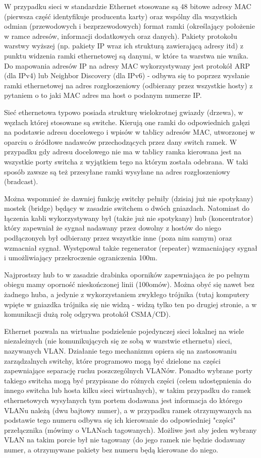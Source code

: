 W przypadku sieci w standardzie Ethernet stosowane są 48 bitowe adresy MAC (pierwsza część identyfikuje producenta karty) oraz wspólny dla wszystkich odmian (przewodowych i bezprzewodowych) format ramki (określający położenie w ramce adresów, informacji dodatkowych oraz danych). Pakiety protokołu warstwy wyższej (np. pakiety IP wraz ich strukturą zawierającą adresy itd) z punktu widzenia ramki ethernetowej są danymi, w które ta warstwa nie wnika. Do mapowania adresów IP na adresy MAC wykorzystywany jest protokół ARP (dla IPv4) lub Neighbor Discovery (dla IPv6) - odbywa się to poprzez wysłanie ramki ethernetowej na adres rozgłoszeniowy (odbierany przez wszystkie hosty) z pytaniem o to jaki MAC adres ma host o podanym numerze IP.

Sieć ethernetowa typowo posiada strukturę wielokrotnej gwiazdy (drzewa), w węzłach której stosowane są switche. Kierują one ramki do odpowiednich gałęzi na podstawie adresu docelowego i wpisów w tablicy adresów MAC, utworzonej w oparciu o źródłowe nadawców przechodzących przez dany switch ramek. W przypadku gdy adresu docelowego nie ma w tablicy ramka kierowana jest na wszystkie porty switcha z wyjątkiem tego na którym została odebrana. W taki sposób zawsze są też przesyłane ramki wysyłane na adres rozgłoszeniowy (bradcast).

\begin{teacherOnly}
Można wspomnieć że dawniej funkcję switchy pełniły (dzisiaj już nie spotykany) mostek (bridge) będący w zasadzie switchem o dwóch gniazdach.
Natomiast do łączenia kabli wykorzystywany był (także już nie spotykany) hub (koncentrator) który zapewniał że sygnał nadawany przez dowolny z hostów do niego podłączonych był odbierany przez wszystkie inne (poza nim samym) oraz wzmacniał sygnał. Występował także regenerator (repeater) wzmacniający sygnał i umożliwiający przekroczenie ograniczenia 100m.

Najprostszy hub to w zasadzie drabinka oporników zapewniająca że po pełnym obiegu mamy oporność nieskończonej linii (100omów).
Można obyć się nawet bez żadnego huba, a jedynie z wykorzystaniem zwykłego trójnika (tutaj komputery wpięte w gniazdka trójnika się nie widzą - widzą tylko ten po drugiej stronie, a w komunikacji dużą rolę odgrywa protokół CSMA/CD).
\end{teacherOnly}

Ethernet pozwala na wirtualne podzielenie pojedynczej sieci lokalnej na wiele niezależnych (nie komunikujących się ze sobą w warstwie ethernetu) sieci, nazywanych VLAN. Działanie tego mechanizmu opiera się na zastosowaniu zarządzalnych switchy, które programowo mogą być dzielone na części zapewniające separację ruchu poszczególnych VLANów. Ponadto wybrane porty takiego switcha mogą być przypisane do różnych części (celem udostępnienia do innego switcha lub hosta kilku sieci wirtualnych), w takim przypadku do ramek ethernetowych wysyłanych tym portem dodawana jest informacja do którego VLANu należą (dwu bajtowy numer), a w przypadku ramek otrzymywanych na podstawie tego numeru odbywa się ich kierowanie do odpowiedniej "części" przełącznika (mówimy o VLANach tagowanych). Możliwe jest aby jeden wybrany VLAN na takim porcie był nie tagowany (do jego ramek nie będzie dodawany numer, a otrzymywane pakiety bez numeru będą kierowane do niego.

